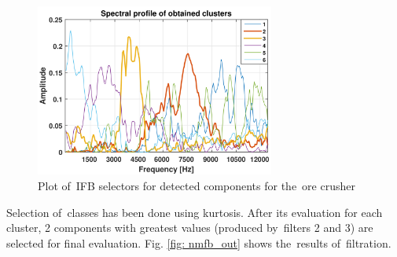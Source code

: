 \begin{figure}[!ht]
\centering
\includegraphics[width = 0.7\textwidth]{wykresy/nmfb_filt}
\caption{Plot of~IFB selectors for detected components for the~ore crusher}
\label{fig: nmfb_filt}
\end{figure}

Selection of~classes has been done using kurtosis. After its evaluation for each cluster, 2 components with greatest values (produced by~filters 2 and 3) are selected for final evaluation. Fig. \ref{fig: nmfb_out} shows the~results of~filtration.


